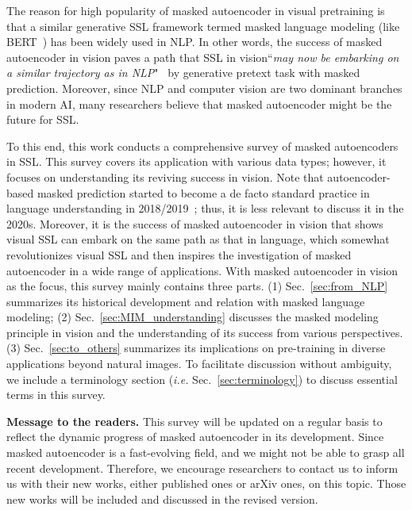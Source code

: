\documentclass[10pt,journal,compsoc]{IEEEtran}
\begin{document}
The reason for high popularity of masked autoencoder in visual pretraining is that a similar generative SSL framework termed masked language modeling (like BERT~\cite{devlin2019bert}) has been widely used in NLP. In other words, the success of masked autoencoder in vision paves a path that SSL in vision``\textit{may now be embarking on a similar trajectory as in NLP}"~\cite{he2022masked} by generative pretext task with masked prediction. Moreover, since NLP and computer vision are two dominant branches in modern AI, many researchers believe that masked autoencoder might be the future for SSL.


To this end, this work conducts a comprehensive survey of masked autoencoders in SSL. This survey covers its application with various data types; however, it focuses on understanding its reviving success in vision. Note that autoencoder-based masked prediction started to become a de facto standard practice in language understanding in 2018/2019~\cite{devlin2019bert}; thus, it is less relevant to discuss it in the 2020s. Moreover, it is the success of masked autoencoder in vision that shows visual SSL can embark on the same path as that in language, which somewhat revolutionizes visual SSL and then inspires the investigation of masked autoencoder in a wide range of applications. With masked autoencoder in vision as the focus, this survey mainly contains three parts. (1) Sec.~\ref{sec:from_NLP} summarizes its historical development and relation with masked language modeling; (2) Sec.~\ref{sec:MIM_understanding} discusses the masked modeling principle in vision and the understanding of its success from various perspectives. (3) Sec.~\ref{sec:to_others} summarizes its implications on pre-training in diverse applications beyond natural images. To facilitate discussion without ambiguity, we include a terminology section (\textit{i.e.} Sec.~\ref{sec:terminology}) to discuss essential terms in this survey.





\textbf{Message to the readers.} This survey will be updated on a regular basis to reflect the dynamic progress of masked autoencoder in its development. Since masked autoencoder is a fast-evolving field, and we might not be able to grasp all recent development. Therefore, we encourage researchers to contact us to inform us with their new works, either published ones or arXiv ones, on this topic. Those new works will be included and discussed in the revised version. 
\end{document}
